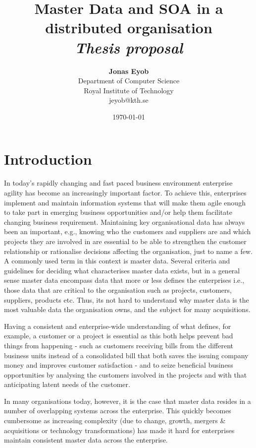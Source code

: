 \documentclass[12pt]{article}
\title{{\bf Master Data and SOA in a distributed organisation} \\
\it Thesis proposal}
\author{ {\bf Jonas Eyob}  \\
Department of Computer Science \\
Royal Institute of Technology \\
{\small jeyob@kth.se}
}
\date{\today}
\begin{document}
\pagestyle{plain}
\maketitle


\pagebreak

\cleardoublepage
{}

\section{Introduction}
\label{ch:intro}

In today’s rapidly changing and fast paced business environment enterprise agility has become an increasingly important factor. To achieve this, enterprises implement and maintain information systems that will make them agile enough to take part in emerging business opportunities and/or help them facilitate changing business requirement. Maintaining key organisational data has always been an important, e.g., knowing who the customers and suppliers are and which projects they are involved in are essential to be able to strengthen the customer relationship or rationalise decisions affecting the organisation, just to name a few. A commonly used term in this context is master data. Several criteria and guidelines for deciding what characterises master data exists, but in a general sense master data encompass data that more or less defines the enterprises i.e., those data that are critical to the organisation such as projects, customers, suppliers, products etc. Thus, its not hard to understand why master data is the most valuable data the organisation owns, and the subject for many acquisitions.  

Having a consistent and enterprise-wide understanding of what defines, for example, a customer or a project is essential as this both helps prevent bad things from happening - such as customers receiving bills from the different business units instead of a consolidated bill that both saves the issuing company money and improves customer satisfaction - and to seize beneficial business opportunities by analysing the customers involved in the projects and with that anticipating latent needs of the customer.

In many organisations today, however, it is the case that master data resides in a number of overlapping systems across the enterprise. This quickly becomes cumbersome as increasing complexity (due to change, growth, mergers \& acquisitions or technology transformations)  has made it hard for enterprises maintain consistent master data across the enterprise.
\end{document}
